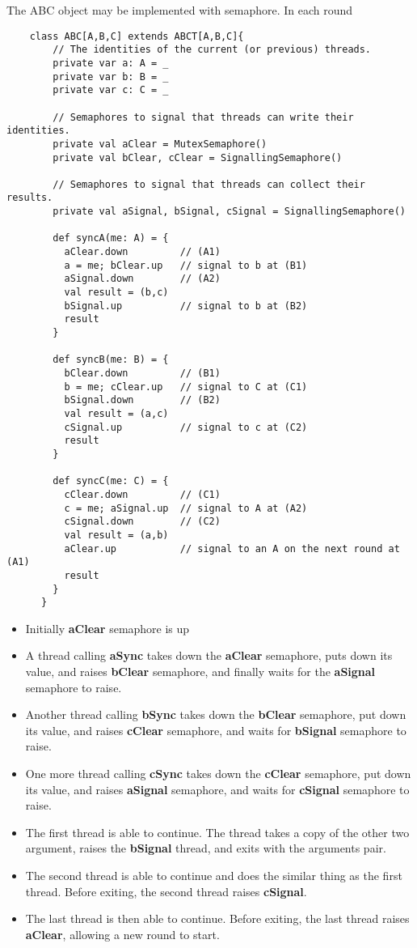 \documentclass{article}
\begin{document}
The ABC object may be implemented with semaphore. In each round

\begin{verbatim}
    class ABC[A,B,C] extends ABCT[A,B,C]{
        // The identities of the current (or previous) threads.
        private var a: A = _
        private var b: B = _
        private var c: C = _
      
        // Semaphores to signal that threads can write their identities.
        private val aClear = MutexSemaphore()
        private val bClear, cClear = SignallingSemaphore()
      
        // Semaphores to signal that threads can collect their results. 
        private val aSignal, bSignal, cSignal = SignallingSemaphore()
      
        def syncA(me: A) = {
          aClear.down         // (A1)
          a = me; bClear.up   // signal to b at (B1)
          aSignal.down        // (A2)
          val result = (b,c)
          bSignal.up          // signal to b at (B2)
          result
        }
      
        def syncB(me: B) = {
          bClear.down         // (B1)
          b = me; cClear.up   // signal to C at (C1)
          bSignal.down        // (B2)
          val result = (a,c)
          cSignal.up          // signal to c at (C2)
          result
        }
      
        def syncC(me: C) = {
          cClear.down         // (C1)
          c = me; aSignal.up  // signal to A at (A2)
          cSignal.down        // (C2)
          val result = (a,b)
          aClear.up           // signal to an A on the next round at (A1)
          result
        }
      }      
\end{verbatim}

\begin{itemize}
    \item Initially \textbf{aClear} semaphore is up
    \item A thread calling \textbf{aSync} takes down the \textbf{aClear} semaphore, puts down its value, and raises \textbf{bClear} semaphore, and finally waits for the \textbf{aSignal} semaphore to raise.
    \item Another thread calling \textbf{bSync} takes down the \textbf{bClear} semaphore, put down its value, and raises \textbf{cClear} semaphore, and waits for \textbf{bSignal} semaphore to raise.
    \item One more thread calling \textbf{cSync} takes down the \textbf{cClear} semaphore, put down its value, and raises \textbf{aSignal} semaphore, and waits for \textbf{cSignal} semaphore to raise.
    \item The first thread is able to continue. The thread takes a copy of the other two argument, raises the \textbf{bSignal} thread, and exits with the arguments pair.
    \item The second thread is able to continue and does the similar thing as the first thread. Before exiting, the second thread raises \textbf{cSignal}.
    \item The last thread is then able to continue. Before exiting, the last thread raises \textbf{aClear}, allowing a new round to start.
\end{itemize}
\end{document}

